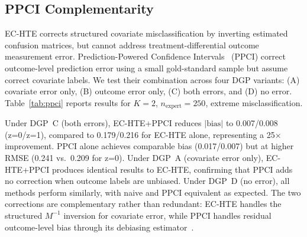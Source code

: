 \subsection{PPCI Complementarity}
\label{sec:ppci}

EC-HTE corrects structured covariate misclassification by inverting estimated confusion matrices, but cannot address treatment-differential outcome measurement error.
Prediction-Powered Confidence Intervals~\cite{angelopoulos2023ppi} (PPCI) correct outcome-level prediction error using a small gold-standard sample but assume correct covariate labels.
We test their combination across four DGP variants: (A) covariate error only, (B) outcome error only, (C) both errors, and (D) no error.
Table~\ref{tab:ppci} reports results for $K{=}2$, $n_{\text{expert}}{=}250$, extreme misclassification.

Under DGP~C (both errors), EC-HTE+PPCI reduces $|\text{bias}|$ to 0.007/0.008 (z=0/z=1), compared to 0.179/0.216 for EC-HTE alone, representing a 25$\times$ improvement.
PPCI alone achieves comparable bias (0.017/0.007) but at higher RMSE (0.241 vs.\ 0.209 for z=0).
Under DGP~A (covariate error only), EC-HTE+PPCI produces identical results to EC-HTE, confirming that PPCI adds no correction when outcome labels are unbiased.
Under DGP~D (no error), all methods perform similarly, with naive and PPCI equivalent as expected.
The two corrections are complementary rather than redundant: EC-HTE handles the structured $M^{-1}$ inversion for covariate error, while PPCI handles residual outcome-level bias through its debiasing estimator~\cite{sui2026ppci}.

